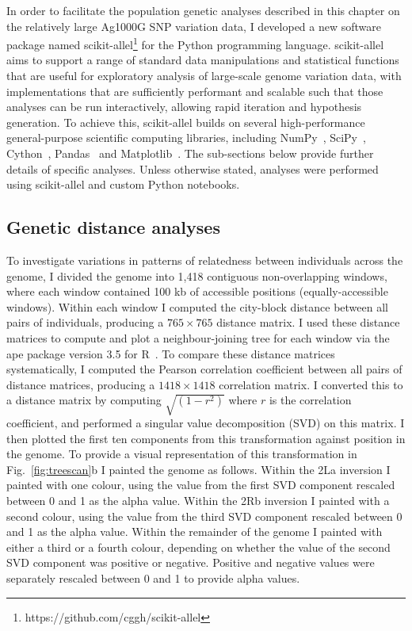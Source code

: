 \begin{refsection}
In order to facilitate the population genetic analyses described in this chapter on the relatively large Ag1000G SNP variation data, I developed a new software package named scikit-allel\footnote{https://github.com/cggh/scikit-allel} for the Python programming language.
%
scikit-allel aims to support a range of standard data manipulations and statistical functions that are useful for exploratory analysis of large-scale genome variation data, with implementations that are sufficiently performant and scalable such that those analyses can be run interactively, allowing rapid iteration and hypothesis generation.
%
To achieve this, scikit-allel builds on several high-performance general-purpose scientific computing libraries, including NumPy~\parencite{Harris2020}, SciPy~\parencite{Virtanen2020}, Cython~\parencite{Behnel2011}, Pandas~\parencite{McKinney2010} and Matplotlib~\parencite{Hunter2007}.
%
The sub-sections below provide further details of specific analyses.
%
Unless otherwise stated, analyses were performed using scikit-allel and custom Python notebooks.


\subsection{Genetic distance analyses}\label{subsec:methods-genetic-distance}

To investigate variations in patterns of relatedness between individuals across the genome, I divided the genome into 1,418 contiguous non-overlapping windows, where each window contained 100 kb of accessible positions (equally-accessible windows).
%
Within each window I computed the city-block distance between all pairs of individuals, producing a $765 \times 765$ distance matrix.
%
I used these distance matrices to compute and plot a neighbour-joining tree for each window via the ape package version 3.5 for R~\parencite{Popescu2012}.
%
To compare these distance matrices systematically, I computed the Pearson correlation coefficient between all pairs of distance matrices, producing a $1418 \times 1418$ correlation matrix.
%
I converted this to a distance matrix by computing $\sqrt{(1-r^{2})}$ where $r$ is the correlation coefficient, and performed a singular value decomposition (SVD) on this matrix.
%
I then plotted the first ten components from this transformation against position in the genome.
%
To provide a visual representation of this transformation in Fig.~\ref{fig:treescan}b I painted the genome as follows.
%
Within the 2La inversion I painted with one colour, using the value from the first SVD component
rescaled between 0 and 1 as the alpha value.
%
Within the 2Rb inversion I painted with a second colour, using the value from the third SVD component rescaled between 0 and 1 as the alpha value.
%
Within the remainder of the genome I painted with either a third or a fourth colour, depending on whether the value of the second SVD component was positive or negative.
%
Positive and negative values were separately rescaled between 0 and 1 to provide alpha values.



\end{refsection}
